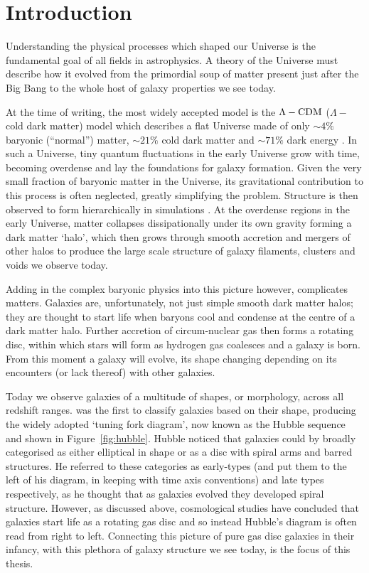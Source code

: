 \chapter{Introduction}\label{chap:intro}

Understanding the physical processes which shaped our Universe is the fundamental goal of all fields in astrophysics. A theory of the Universe must describe how it evolved from the primordial soup of matter present just after the Big Bang to the whole host of galaxy properties we see today. 

At the time of writing, the most widely accepted model is the $\Lambda-\rm{CDM}$ ($\Lambda-$ cold dark matter) model which describes a flat Universe made of only $\sim4\%$ baryonic (``normal'') matter, $\sim21\%$ cold dark matter and $\sim71\%$ dark energy \citep{planck16}. In such a Universe, tiny quantum fluctuations in the early Universe grow with time, becoming overdense and lay the foundations for galaxy formation. Given the very small fraction of baryonic matter in the Universe, its gravitational contribution to this process is often neglected, greatly simplifying the problem. Structure is then observed to form hierarchically in simulations \citep{citebomb}. At the overdense regions in the early Universe, matter collapses dissipationally under its own gravity forming a dark matter `halo', which then grows through smooth accretion and mergers of other halos to produce the large scale structure of galaxy filaments, clusters and voids we observe today. 

Adding in the complex baryonic physics into this picture however, complicates matters. Galaxies are, unfortunately, not just simple smooth dark matter halos; they are thought to start life when baryons cool and condense at the centre of a dark matter halo. Further accretion of circum-nuclear gas then forms a rotating disc, within which stars will form as hydrogen gas coalesces and a galaxy is born. From this moment a galaxy will evolve, its shape changing depending on its encounters (or lack thereof) with other galaxies. 

Today we observe galaxies of a multitude of shapes, or morphology, across all redshift ranges. \cite{hubble36}  was the first to classify galaxies based on their shape, producing the widely adopted `tuning fork diagram', now known as the Hubble sequence and shown in Figure~\ref{fig:hubble}. Hubble noticed that galaxies could by broadly categorised as either elliptical in shape or as a disc with spiral arms and barred structures. He referred to these categories as early-types (and put them to the left of his diagram, in keeping with time axis conventions) and late types respectively, as he thought that as galaxies evolved they developed spiral structure. However, as discussed above, cosmological studies have concluded that galaxies start life as a rotating gas disc and so instead Hubble's diagram is often read from right to left. Connecting this picture of pure gas disc galaxies in their infancy, with this plethora of galaxy structure we see today, is the focus of this thesis. 

